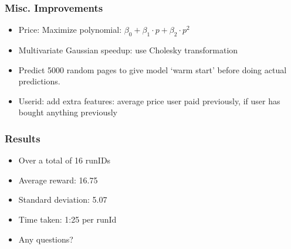 \documentclass{beamer}
\begin{document}
\begin{frame}
	\frametitle{Misc. Improvements}
	\begin{itemize}
		\item Price: Maximize polynomial: $\beta_0 + \beta_1 \cdot p + \beta_2 \cdot p^2$ %
		\item Multivariate Gaussian speedup: use Cholesky transformation
		\item Predict 5000 random pages to give model `warm start' before doing actual predictions.
		\item Userid: add extra features: average price user paid previously, if user has bought anything previously
	\end{itemize}
\end{frame}


\begin{frame}
  \frametitle{Results}

  \begin{itemize}
    \item Over a total of 16 runIDs
    \item Average reward: 16.75
    \item Standard deviation: 5.07
    \item Time taken: 1:25 per runId
    \item Any questions?
  \end{itemize}
\end{frame}
\end{document}
